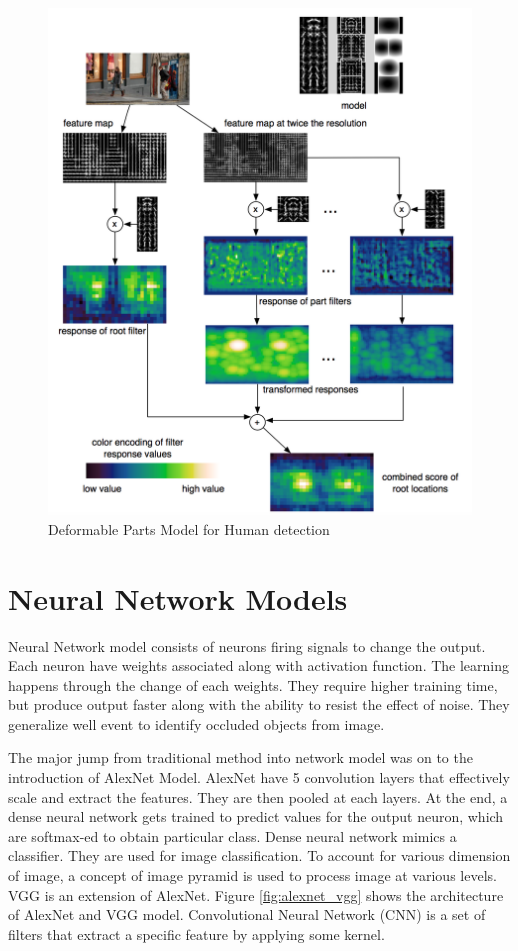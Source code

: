 \begin{figure}[!h]
	\centering
	\includegraphics[height=0.5\textheight]{Images/DPM}
	\caption{Deformable Parts Model for Human detection}
	\label{fig:dpm}

\end{figure}

\section{Neural Network Models}
Neural Network model consists of neurons firing signals to change the output. Each neuron have weights associated along with activation function. The learning happens through the change of each weights. They require higher training time, but produce output faster along with the ability to resist the effect of noise. They generalize well event to identify occluded objects from image. 

The major jump from traditional method into network model was on to the introduction of AlexNet Model. AlexNet have 5 convolution layers that effectively scale and extract the features. They are then pooled at each layers. At the end, a dense neural network gets trained to predict values for the output neuron, which are softmax-ed to obtain particular class. Dense neural network mimics a classifier. They are used for image classification. To account for various dimension of image, a concept of image pyramid is used to process image at various levels. VGG is an extension of AlexNet. Figure \ref{fig:alexnet_vgg} shows the architecture of AlexNet and VGG model. Convolutional Neural Network (CNN) is a set of filters that extract a specific feature by applying some kernel.

